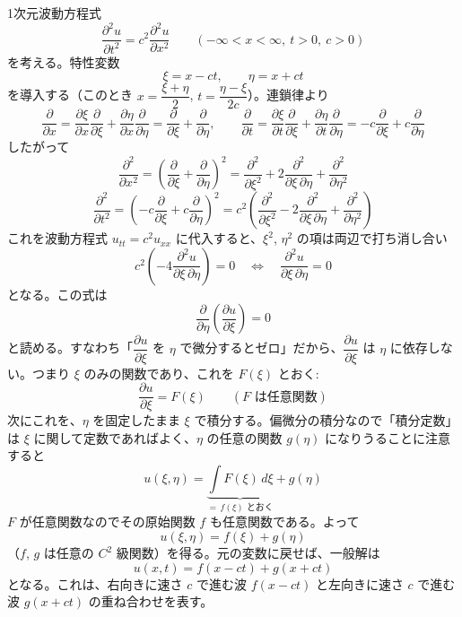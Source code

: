 \documentclass[a4paper,11pt]{article}
\begin{document}


\noindent
1次元波動方程式
\[
\frac{\partial^{2} u}{\partial t^{2}} = c^{2}\frac{\partial^{2} u}{\partial x^{2}} \qquad (-\infty < x < \infty,\ t > 0,\ c > 0)
\]
を考える。特性変数
\[
\xi = x - ct, \qquad \eta = x + ct
\]
を導入する（このとき $x = \dfrac{\xi+\eta}{2}$, $t = \dfrac{\eta-\xi}{2c}$）。連鎖律より
\[
\frac{\partial}{\partial x} = \frac{\partial \xi}{\partial x}\frac{\partial}{\partial \xi} + \frac{\partial \eta}{\partial x}\frac{\partial}{\partial \eta}
= \frac{\partial}{\partial \xi} + \frac{\partial}{\partial \eta},
\qquad
\frac{\partial}{\partial t} = \frac{\partial \xi}{\partial t}\frac{\partial}{\partial \xi} + \frac{\partial \eta}{\partial t}\frac{\partial}{\partial \eta}
= -c\frac{\partial}{\partial \xi} + c\frac{\partial}{\partial \eta}
\]
したがって
\[
\frac{\partial^{2}}{\partial x^{2}} = \left(\frac{\partial}{\partial \xi} + \frac{\partial}{\partial \eta}\right)^{2}
= \frac{\partial^{2}}{\partial \xi^{2}} + 2\frac{\partial^{2}}{\partial \xi\,\partial \eta} + \frac{\partial^{2}}{\partial \eta^{2}}
\]
\[
\frac{\partial^{2}}{\partial t^{2}} = \left(-c\frac{\partial}{\partial \xi} + c\frac{\partial}{\partial \eta}\right)^{2}
= c^{2}\left(\frac{\partial^{2}}{\partial \xi^{2}} - 2\frac{\partial^{2}}{\partial \xi\,\partial \eta} + \frac{\partial^{2}}{\partial \eta^{2}}\right)
\]
これを波動方程式 $u_{tt} = c^{2}u_{xx}$ に代入すると、$\xi^{2}$, $\eta^{2}$ の項は両辺で打ち消し合い
\[
c^{2}\left(-4\frac{\partial^{2} u}{\partial \xi\,\partial \eta}\right) = 0
\quad\Longleftrightarrow\quad
\frac{\partial^{2} u}{\partial \xi\,\partial \eta} = 0
\]
となる。この式は
\[
\frac{\partial}{\partial \eta}\left(\frac{\partial u}{\partial \xi}\right) = 0
\]
と読める。すなわち「$\dfrac{\partial u}{\partial \xi}$ を $\eta$ で微分するとゼロ」だから、$\dfrac{\partial u}{\partial \xi}$ は $\eta$ に依存しない。つまり $\xi$ のみの関数であり、これを $F(\xi)$ とおく:
\[
\frac{\partial u}{\partial \xi} = F(\xi) \qquad (F \text{ は任意関数})
\]
次にこれを、$\eta$ を固定したまま $\xi$ で積分する。偏微分の積分なので「積分定数」は $\xi$ に関して定数であればよく、$\eta$ の任意の関数 $g(\eta)$ になりうることに注意すると
\[
u(\xi,\eta) = \underbrace{\int F(\xi)\,d\xi}_{=\,f(\xi) \text{ とおく}} + g(\eta)
\]
$F$ が任意関数なのでその原始関数 $f$ も任意関数である。よって
\[
u(\xi,\eta) = f(\xi) + g(\eta)
\]
（$f$, $g$ は任意の $C^{2}$ 級関数）を得る。元の変数に戻せば、一般解は
\[
u(x,t) = f(x-ct) + g(x+ct)
\]
となる。これは、右向きに速さ $c$ で進む波 $f(x-ct)$ と左向きに速さ $c$ で進む波 $g(x+ct)$ の重ね合わせを表す。
\end{document}
